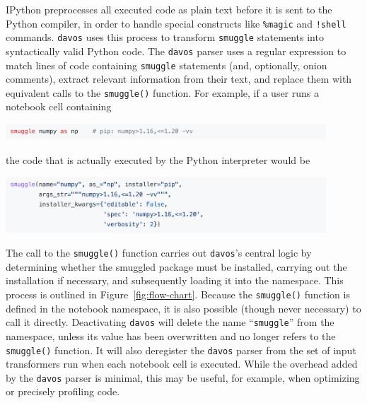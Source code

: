 \documentclass[preprint,12pt,a4paper]{elsarticle}
\begin{document}
IPython preprocesses all executed code as plain text before it is sent
to the Python compiler, in order to handle special constructs like
\texttt{\%magic} and \texttt{!shell} commands. \texttt{davos} uses
this process to transform \texttt{smuggle} statements into
syntactically valid Python code. The \texttt{davos} parser uses a
regular expression to match lines of code containing \texttt{smuggle}
statements (and, optionally, onion comments), extract relevant
information from their text, and replace them with equivalent calls to
the \texttt{smuggle()} function. For example, if a user runs a
notebook cell containing
\begin{center}
\includegraphics[width=0.9\textwidth]{figs/snippet6}
\end{center}
the code that is actually executed by the Python interpreter would be
\begin{center}
\includegraphics[width=0.9\textwidth]{figs/snippet7}
\end{center}
The call to the \texttt{smuggle()} function carries out
\texttt{davos}'s central logic by determining whether the smuggled
package must be installed, carrying out the installation if necessary,
and subsequently loading it into the namespace. This process is
outlined in Figure~\ref{fig:flow-chart}. Because the
\texttt{smuggle()} function is defined in the notebook namespace, it
is also possible (though never necessary) to call it
directly. Deactivating \texttt{davos} will delete the name
``\texttt{smuggle}'' from the namespace, unless its value has been
overwritten and no longer refers to the \texttt{smuggle()}
function. It will also deregister the \texttt{davos} parser from the
set of input transformers run when each notebook cell is
executed. While the overhead added by the \texttt{davos} parser is
minimal, this may be useful, for example, when optimizing or precisely
profiling code.
\end{document}
